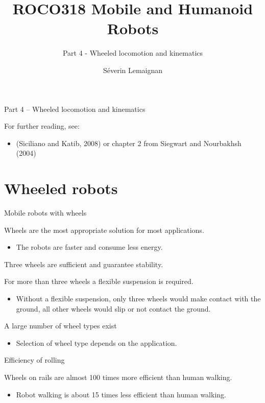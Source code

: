 \documentclass[compress]{beamer}
\title{ROCO318 \newline Mobile and Humanoid Robots}
\subtitle{Part 4 - Wheeled locomotion and kinematics}
\date{}
\author{Séverin Lemaignan}
\institute{Centre for Neural Systems and Robotics\\{\bf Plymouth University}}
\begin{document}

\maketitle

\begin{frame}{Part 4 -- Wheeled locomotion and kinematics}

For further reading, see:
    
    \begin{itemize}
        \item (Siciliano and Katib, 2008) or chapter 2 from Siegwart and
Nourbakhsh (2004)
    \end{itemize}
\end{frame}

\section{Wheeled robots}

\begin{frame}{Mobile robots with wheels}

Wheels are the most appropriate solution for most applications.

\begin{itemize}
    \item The robots are faster and consume less energy.
\end{itemize}

Three wheels are sufficient and guarantee stability.

For more than three wheels a flexible suspension is required.

\begin{itemize}
    \item Without a flexible suspension, only three wheels would make contact
  with the ground, all other wheels would slip or not contact the
  ground.
\end{itemize}

A large number of wheel types exist

\begin{itemize}
    \item Selection of wheel type depends on the application.
\end{itemize}

\end{frame}

\begin{frame}{Efficiency of rolling}

Wheels on rails are almost 100 times more efficient than human walking.

\begin{itemize}
    \item Robot walking is about 15 times less efficient than human walking.
\end{itemize}

\end{frame}
\end{document}
